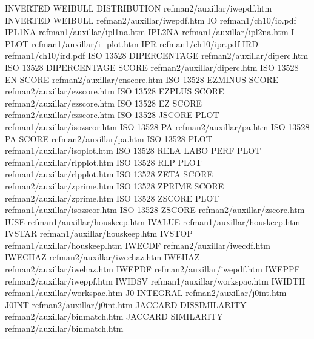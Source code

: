 INVERTED WEIBULL DISTRIBUTION           refman2/auxillar/iwepdf.htm
INVERTED WEIBULL                        refman2/auxillar/iwepdf.htm
IO                                      refman1/ch10/io.pdf
IPL1NA                                  refman1/auxillar/ipl1na.htm
IPL2NA                                  refman1/auxillar/ipl2na.htm
I PLOT                                  refman1/auxillar/i_plot.htm
IPR                                     refman1/ch10/ipr.pdf
IRD                                     refman1/ch10/ird.pdf
ISO 13528 DIPERCENTAGE                  refman2/auxillar/diperc.htm
ISO 13528 DIPERCENTAGE SCORE            refman2/auxillar/diperc.htm
ISO 13528 EN SCORE                      refman2/auxillar/enscore.htm
ISO 13528 EZMINUS SCORE                 refman2/auxillar/ezscore.htm
ISO 13528 EZPLUS SCORE                  refman2/auxillar/ezscore.htm
ISO 13528 EZ SCORE                      refman2/auxillar/ezscore.htm
ISO 13528 JSCORE PLOT                   refman1/auxillar/isozscor.htm
ISO 13528 PA                            refman2/auxillar/pa.htm
ISO 13528 PA SCORE                      refman2/auxillar/pa.htm
ISO 13528 PLOT                          refman1/auxillar/isoplot.htm
ISO 13528 RELA LABO PERF PLOT           refman1/auxillar/rlpplot.htm
ISO 13528 RLP PLOT                      refman1/auxillar/rlpplot.htm
ISO 13528 ZETA SCORE                    refman2/auxillar/zprime.htm
ISO 13528 ZPRIME SCORE                  refman2/auxillar/zprime.htm
ISO 13528 ZSCORE PLOT                   refman1/auxillar/isozscor.htm
ISO 13528 ZSCORE                        refman2/auxillar/zscore.htm
IUSE                                    refman1/auxillar/houskeep.htm
IVALUE                                  refman1/auxillar/houskeep.htm
IVSTAR                                  refman1/auxillar/houskeep.htm
IVSTOP                                  refman1/auxillar/houskeep.htm
IWECDF                                  refman2/auxillar/iwecdf.htm
IWECHAZ                                 refman2/auxillar/iwechaz.htm
IWEHAZ                                  refman2/auxillar/iwehaz.htm
IWEPDF                                  refman2/auxillar/iwepdf.htm
IWEPPF                                  refman2/auxillar/iweppf.htm
IWIDSV                                  refman1/auxillar/workspac.htm
IWIDTH                                  refman1/auxillar/workspac.htm
J0 INTEGRAL                             refman2/auxillar/j0int.htm
J0INT                                   refman2/auxillar/j0int.htm
JACCARD DISSIMILARITY                   refman2/auxillar/binmatch.htm
JACCARD SIMILARITY                      refman2/auxillar/binmatch.htm
